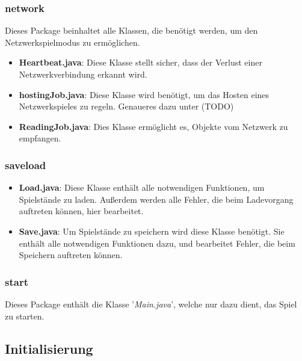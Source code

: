 \documentclass[12pt,a4paper]{article}
\begin{document}
{%

\subsubsection{network}

Dieses Package beinhaltet alle Klassen, die benötigt werden, um den Netzwerkspielmodus zu ermöglichen.

\begin{itemize}
	\item{\textbf{Heartbeat.java}: Diese Klasse stellt sicher, dass der Verlust einer Netzwerkverbindung erkannt wird.}
	\item{\textbf{hostingJob.java}: Diese Klasse wird benötigt, um das Hosten eines Netzwerkspieles zu regeln. Genaueres dazu unter (TODO)} %
	\item{\textbf{ReadingJob.java}: Dies Klasse ermöglicht es, Objekte vom Netzwerk zu empfangen. }
\end{itemize}

\subsubsection{saveload}

\begin{itemize}

	\item{\textbf{Load.java}: Diese Klasse enthält alle notwendigen Funktionen, um Spielstände zu laden. Außerdem werden alle Fehler, die beim Ladevorgang auftreten können, hier bearbeitet.  }
	
	\item{\textbf{Save.java}: Um Spielstände zu speichern wird diese Klasse benötigt. Sie enthält alle notwendigen Funktionen dazu, und bearbeitet Fehler, die beim Speichern auftreten können. }


\end{itemize}

\subsubsection{start}

Dieses Package enthält die Klasse '\textit{Main.java}', welche nur dazu dient, das Spiel zu starten.

\newpage
\subsection{Initialisierung}
\label{SUBSEC:INIT}

}
\end{document}
